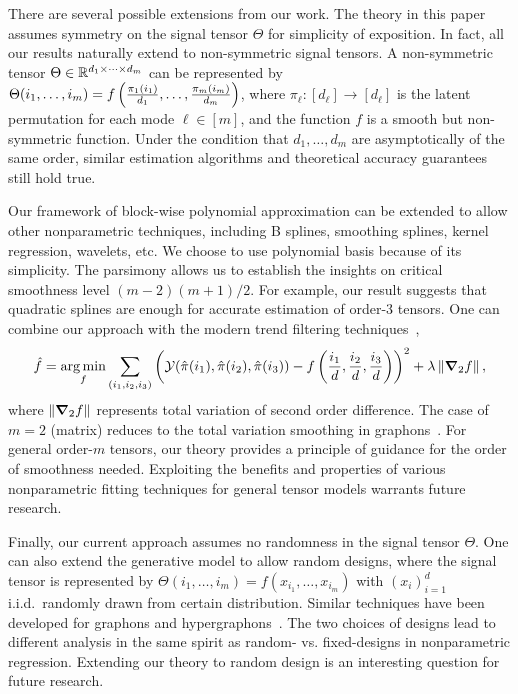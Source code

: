 \documentclass[12pt]{article}
\theoremstyle{definition}
\begin{document}
There are several possible extensions from our work. The theory in this paper assumes symmetry on the signal tensor $\Theta$ for simplicity of exposition. In fact, all our results naturally extend to non-symmetric signal tensors. A non-symmetric tensor $\Theta\in\mathbb{R}^{d_1\times \cdots\times d_m}$ can be represented by $\Theta(i_1,\ldots,i_m) = f\left({\pi_1(i_1)\over d_1},\ldots,{\pi_m(i_m)\over d_m}\right)$, where $\pi_\ell\colon [d_\ell]\rightarrow [d_\ell]$ is the latent permutation for each mode $\ell\in[m]$, and the function $f$ is a smooth but non-symmetric function. Under the condition that $d_1,\ldots, d_m$ are asymptotically of the same order, similar estimation algorithms and theoretical accuracy guarantees still hold true.  

Our framework of block-wise polynomial approximation can be extended to allow other nonparametric techniques, including B splines, smoothing splines, kernel regression, wavelets, etc. We choose to use polynomial basis because of its simplicity. The parsimony allows us to establish the insights on critical smoothness level $ (m-2)(m+1)/2$. For example, our result suggests that quadratic splines are enough for accurate estimation of order-3 tensors. One can combine our approach with the modern trend filtering techniques~\cite{tibshirani2014adaptive,ortelli2019prediction},
\[
\hat f =\operatorname*{arg\,min}_{f}\sum_{(i_1,i_2,i_3)}\left(\mathcal{Y}(\hat \pi(i_1),\hat \pi(i_2),\hat \pi(i_3))-f\left({i_1\over d},{i_2\over d},{i_3\over d}\right)\right)^2+\lambda \left\lVert{\boldsymbol \nabla}_2 f\right\rVert,
\]
where $\left\lVert{\boldsymbol \nabla}_2 f\right\rVert$ represents total variation of second order difference. The case of $m=2$ (matrix) reduces to the total variation smoothing in graphons~\cite{chan2014consistent}. For general order-$m$ tensors, our theory provides a principle of guidance for the order of smoothness needed. Exploiting the benefits and properties of various nonparametric fitting techniques for general tensor models warrants future research.

Finally, our current approach assumes no randomness in the signal tensor $\Theta$. One can also extend the generative model to allow random designs, where the signal tensor is represented by $\Theta(i_1,\ldots,i_m)=f(x_{i_1},\ldots,x_{i_m})$ with $(x_i)_{i=1}^d$ i.i.d.\ randomly drawn from certain distribution. Similar techniques have been developed for graphons and hypergraphons~\cite{chan2014consistent,gao2015rate,klopp2017oracle,balasubramanian2021nonparametric}. The two choices of designs lead to different analysis in the same spirit as random- vs. fixed-designs in nonparametric regression. Extending our theory to random design is an interesting question for future research.
\end{document}
